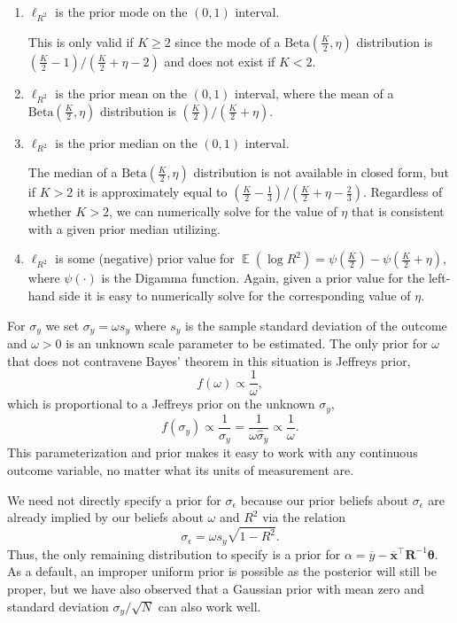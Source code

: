 \documentclass[11pt]{article}
\DeclareMathOperator{\E}{\mathbb{E}}
\begin{document}
\begin{enumerate}
\item $\ell_{R^2}$ is the prior mode on the $\left(0,1\right)$ interval.

This is only valid if $K \geq 2$ since the mode of a
$\mathrm{Beta}\left(\frac{K}{2},\eta\right)$ distribution is \newline
$\left(\frac{K}{2} - 1\right) / \left(\frac{K}{2} + \eta - 2\right)$
and does not exist if $K < 2$.

\item $\ell_{R^2}$ is the prior mean on the $\left(0,1\right)$ interval, where
the mean of a $\mathrm{Beta}\left(\frac{K}{2}, \eta\right)$ distribution is
$\left(\frac{K}{2}\right) / \left(\frac{K}{2} + \eta\right)$.


\item $\ell_{R^2}$ is the prior median on the $\left(0,1\right)$ interval.

The median of a $\mathrm{Beta}\left(\frac{K}{2},\eta\right)$ distribution is not
available in closed form, but if $K > 2$ it is approximately equal to
$\left(\frac{K}{2} - \frac{1}{3}\right) / \left(\frac{K}{2} +
\eta - \frac{2}{3}\right)$.
Regardless of whether $K > 2$, we can numerically solve for the value of $\eta$
that is consistent with a given prior median utilizing.

\item $\ell_{R^2}$ is some (negative) prior value for
$\E\left(\log R^2\right) = \psi\left(\frac{K}{2}\right) -
\psi\left(\frac{K}{2}+\eta\right)$,
where $\psi\left(\cdot\right)$ is the Digamma function. Again, given a prior
value for the left-hand side it is easy to numerically solve for the
corresponding value of $\eta$.
\end{enumerate}


For $\sigma_y$ we set $\sigma_y = \omega s_y$ where $s_y$ is the sample standard
deviation of the outcome and $\omega > 0$ is an unknown scale parameter to be
estimated. The only prior for $\omega$ that does not contravene Bayes' theorem
in this situation is Jeffreys prior,
$$f\left(\omega\right) \propto \frac{1}{\omega},$$
which is proportional to a Jeffreys prior on the unknown $\sigma_y$,
$$f\left(\sigma_y\right) \propto \frac{1}{\sigma_y}
= \frac{1}{\omega \widehat{\sigma}_y} \propto \frac{1}{\omega}.$$
This parameterization and prior makes it easy to work with any continuous
outcome variable, no matter what its units of measurement are.

We need not directly specify a prior for $\sigma_{\epsilon}$ because our prior
beliefs about $\sigma_{\epsilon}$ are already implied by our beliefs about
$\omega$ and $R^2$ via the relation
$$\sigma_{\epsilon} = \omega s_y \sqrt{1 - R^2}.$$
Thus, the only remaining distribution to specify is a prior for
$\alpha =
\overline{y} - \overline{\mathbf{x}}^\top \mathbf{R}^{-1} \boldsymbol{\theta}$.
As a default, an improper uniform prior is possible as the posterior will still
be proper, but we have also observed that a Gaussian prior with mean zero and
standard deviation $\sigma_y / \sqrt{N}$ can also work well.
\end{document}
